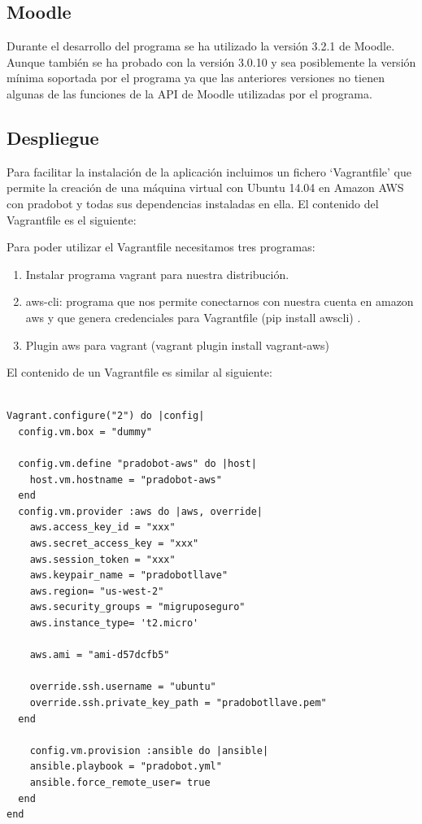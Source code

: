 \subsection{Moodle}

Durante el desarrollo del programa se ha utilizado la versión 3.2.1 de Moodle. Aunque también se ha probado con la versión 3.0.10 y sea posiblemente la versión mínima soportada por el programa ya que las anteriores versiones no tienen algunas de las funciones de la API de Moodle utilizadas por el programa.


\subsection{Despliegue}

Para facilitar la instalación de la aplicación incluimos un fichero \enquote*{Vagrantfile} que permite la creación de una máquina virtual con Ubuntu 14.04 en Amazon AWS con pradobot y todas sus dependencias instaladas en ella. El contenido del Vagrantfile es el siguiente:

Para poder utilizar el Vagrantfile necesitamos tres programas: 

\begin{enumerate}
\item Instalar programa vagrant para nuestra distribución.
\item aws-cli: programa que nos permite conectarnos con nuestra cuenta en amazon aws y que genera credenciales para Vagrantfile (pip install awscli) .
\item Plugin aws para vagrant (vagrant plugin install vagrant-aws)
\end{enumerate}

El contenido de un Vagrantfile es similar al siguiente:
\begin{lstlisting}

Vagrant.configure("2") do |config|
  config.vm.box = "dummy"

  config.vm.define "pradobot-aws" do |host|
    host.vm.hostname = "pradobot-aws"
  end
  config.vm.provider :aws do |aws, override|
    aws.access_key_id = "xxx"
    aws.secret_access_key = "xxx"
    aws.session_token = "xxx"
    aws.keypair_name = "pradobotllave"
    aws.region= "us-west-2"
    aws.security_groups = "migruposeguro"
    aws.instance_type= 't2.micro'
   
    aws.ami = "ami-d57dcfb5"

    override.ssh.username = "ubuntu"
    override.ssh.private_key_path = "pradobotllave.pem"
  end
  
    config.vm.provision :ansible do |ansible|
	ansible.playbook = "pradobot.yml"
	ansible.force_remote_user= true
  end
end
 
\end{lstlisting}

